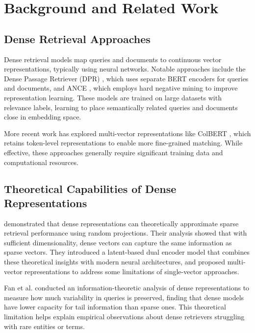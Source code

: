 \documentclass[manuscript]{acmart}
\begin{document}
\section{Background and Related Work}
\subsection{Dense Retrieval Approaches}
Dense retrieval models map queries and documents to continuous vector representations, typically using neural networks. Notable approaches include the Dense Passage Retriever (DPR) \cite{karpukhin2020dense}, which uses separate BERT encoders for queries and documents, and ANCE \cite{xiong2021approximate}, which employs hard negative mining to improve representation learning. These models are trained on large datasets with relevance labels, learning to place semantically related queries and documents close in embedding space.

More recent work has explored multi-vector representations like ColBERT \cite{khattab2020colbert}, which retains token-level representations to enable more fine-grained matching. While effective, these approaches generally require significant training data and computational resources.

\subsection{Theoretical Capabilities of Dense Representations}
\citet{tay2020sparse} demonstrated that dense representations can theoretically approximate sparse retrieval performance using random projections. Their analysis showed that with sufficient dimensionality, dense vectors can capture the same information as sparse vectors. They introduced a latent-based dual encoder model that combines these theoretical insights with modern neural architectures, and proposed multi-vector representations to address some limitations of single-vector approaches.

Fan et al. \cite{fan2022information} conducted an information-theoretic analysis of dense representations to measure how much variability in queries is preserved, finding that dense models have lower capacity for tail information than sparse ones. This theoretical limitation helps explain empirical observations about dense retrievers struggling with rare entities or terms.
\end{document}
